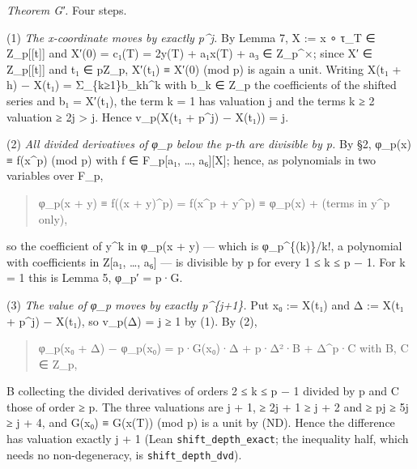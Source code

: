 \documentclass[11pt,a4paper]{article}
\theoremstyle{named}
\begin{document}
\textit{Theorem G′.} Four steps.

(1) \textit{The x-coordinate moves by exactly p\textasciicircum{}j.} By Lemma 7, X := x ∘ τ\_T ∈ Z\_p[[t]] and X′(0) = c₁(T) = 2y(T) + a₁x(T) + a₃ ∈ Z\_p\textasciicircum{}×; since X′ ∈ Z\_p[[t]] and t₁ ∈ pZ\_p, X′(t₁) ≡ X′(0) (mod p) is again a unit. Writing X(t₁ + h) − X(t₁) = Σ\_\{k≥1\}b\_kh\textasciicircum{}k with b\_k ∈ Z\_p the coefficients of the shifted series and b₁ = X′(t₁), the term k = 1 has valuation j and the terms k ≥ 2 valuation ≥ 2j \textgreater{} j. Hence v\_p(X(t₁ + p\textasciicircum{}j) − X(t₁)) = j.

(2) \textit{All divided derivatives of φ\_p below the p-th are divisible by p.} By §2, φ\_p(x) ≡ f(x\textasciicircum{}p) (mod p) with f ∈ F\_p[a₁, …, a₆][X]; hence, as polynomials in two variables over F\_p,

\begin{quote}
φ\_p(x + y) ≡ f((x + y)\textasciicircum{}p) = f(x\textasciicircum{}p + y\textasciicircum{}p) ≡ φ\_p(x) + (terms in y\textasciicircum{}p only),
\end{quote}

so the coefficient of y\textasciicircum{}k in φ\_p(x + y) — which is φ\_p\textasciicircum{}\{(k)\}/k!, a polynomial with coefficients in Z[a₁, …, a₆] — is divisible by p for every 1 ≤ k ≤ p − 1. For k = 1 this is Lemma 5, φ\_p′ = p·G.

(3) \textit{The value of φ\_p moves by exactly p\textasciicircum{}\{j+1\}.} Put x₀ := X(t₁) and Δ := X(t₁ + p\textasciicircum{}j) − X(t₁), so v\_p(Δ) = j ≥ 1 by (1). By (2),

\begin{quote}
φ\_p(x₀ + Δ) − φ\_p(x₀) = p·G(x₀)·Δ + p·Δ²·B + Δ\textasciicircum{}p·C  with B, C ∈ Z\_p,
\end{quote}

B collecting the divided derivatives of orders 2 ≤ k ≤ p − 1 divided by p and C those of order ≥ p. The three valuations are j + 1, ≥ 2j + 1 ≥ j + 2 and ≥ pj ≥ 5j ≥ j + 4, and G(x₀) ≡ G(x(T)) (mod p) is a unit by (ND). Hence the difference has valuation exactly j + 1 (Lean \texttt{shift\_\allowbreak{}depth\_\allowbreak{}exact}; the inequality half, which needs no non-degeneracy, is \texttt{shift\_\allowbreak{}depth\_\allowbreak{}dvd}).
\end{document}
